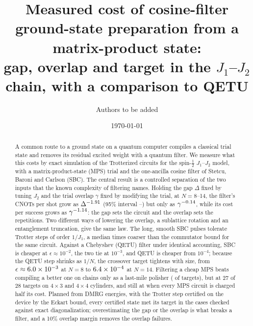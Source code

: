 \documentclass[aps,pra,twocolumn,superscriptaddress,nofootinbib]{revtex4-2}
\begin{document}
\title{Measured cost of cosine-filter ground-state preparation from a matrix-product state:\\
gap, overlap and target in the $J_1$--$J_2$ chain, with a comparison to QETU}

\author{Authors to be added}
\date{\today}

\begin{abstract}
A common route to a ground state on a quantum computer compiles a classical trial state and removes its residual
excited weight with a quantum filter. We measure what this costs by exact simulation of the Trotterized circuits for
the spin-$\tfrac12$ $J_1$--$J_2$ model, with a matrix-product-state (MPS) trial and the one-ancilla cosine filter of
Stetcu, Baroni and Carlson (SBC). The central result is a controlled separation of the two inputs that the known
complexity of filtering names. Holding the gap $\Delta$ fixed by tuning $J_2$ and the trial overlap $\gamma$ fixed by
modifying the trial, at $N=8$--14, the filter's CNOTs per shot grow as $\Delta^{-1.91}$ (95\% interval
\ciDShotgaplo--\ciDShotgaphi) but only as $\gamma^{-0.14}$, while its cost per success grows as
$\gamma^{-1.14}$: the gap sets the circuit and the overlap sets the repetitions. Two different ways of lowering
the overlap, a sublattice rotation and an entanglement truncation, give the same law. The long, smooth SBC pulses
tolerate Trotter steps of order $1/J_1$, a median \bdCommMed{} times coarser than the commutator bound for the same
circuit. Against a Chebyshev (QETU) filter under identical accounting, SBC is cheaper at $\epsilon\approx10^{-2}$, the
two tie at $10^{-3}$, and QETU is cheaper from $10^{-4}$; because the QETU step shrinks as $1/N$, the crossover target
tightens with size, from $\epsilon\approx6.0\times10^{-3}$ at $N=8$ to $6.4\times10^{-4}$ at $N=14$. Filtering a cheap MPS beats compiling a better one on chains
only as a last-mile polisher (\actOneWins{} of \actOneTot{} targets), but at 27 of 28 targets on $4\times3$ and
$4\times4$ cylinders, and still at \blCylWinsHalf{} when every MPS circuit is charged half its cost. Planned from DMRG
energies, with the Trotter step certified on the device by the Eckart bound, every certified state met its target in
the \ekCert{} cases checked against exact diagonalization; overestimating the gap or the overlap is what breaks a
filter, and a 10\% overlap margin removes the overlap failures.
\end{abstract}

\maketitle
\end{document}
